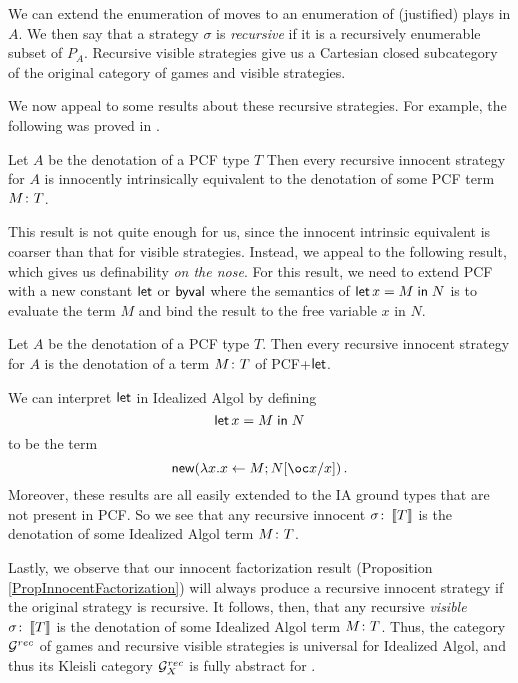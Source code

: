 \documentclass{article}
\begin{document}
We can extend the enumeration of moves to an enumeration of (justified) plays in $A$.  
We then say that a strategy $\sigma$ is \emph{recursive} if it is a recursively enumerable subset of $P_A$.
Recursive visible strategies give us a Cartesian closed subcategory of the original category of games and visible strategies.

We now appeal to some results about these recursive strategies.  
For example, the following was proved in \cite{hoPcf}.

\begin{theorem}
  Let $A$ be the denotation of a PCF type $T$
  Then every recursive innocent strategy for $A$ is innocently intrinsically equivalent to the denotation of some PCF term $M\colon T$.
\end{theorem}

This result is not quite enough for us, since the innocent intrinsic equivalent is coarser than that for visible strategies.  
Instead, we appeal to the following result, which gives us definability \emph{on the nose}.  
For this result, we need to extend PCF with a new constant $\operatorname{\mathsf{let}}$ or $\operatorname{\mathsf{byval}}$ where the semantics of $\operatorname{\mathsf{let}} x = M\mathrel{\mathsf{in}} N$ is to evaluate the term $M$ and bind the result to the free variable $x$ in $N$.

\begin{theorem}
  Let $A$ be the denotation of a PCF type $T$.
  Then every recursive innocent strategy for $A$ is the denotation of a term $M\colon T$ of PCF+$\operatorname{\mathsf{let}}$.
\end{theorem}

We can interpret $\operatorname{\mathsf{let}}$ in Idealized Algol by defining
\[
  \operatorname{\mathsf{let}} x = M \mathrel{\mathsf{in}} N
  \]
to be the term
\[
  \neww (\lambda x. x\gets M;N[\oc x/x])\,.
  \]
Moreover, these results are all easily extended to the IA ground types that are not present in PCF.  
So we see that any recursive innocent $\sigma\colon \left\llbracket T\right\rrbracket$ is the denotation of some Idealized Algol term $M \colon T$.

Lastly, we observe that our innocent factorization result (Proposition \ref{PropInnocentFactorization}) will always produce a recursive innocent strategy if the original strategy is recursive.  
It follows, then, that any recursive \emph{visible} $\sigma\colon \left\llbracket T\right\rrbracket$ is the denotation of some Idealized Algol term $M \colon T$.
Thus, the category $\mathcal G^{rec}$ of games and recursive visible strategies is universal for Idealized Algol, and thus its Kleisli category $\mathcal G^{rec}_X$ is fully abstract for \IAX.
\end{document}
